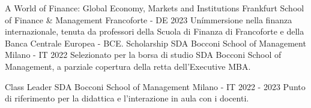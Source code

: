 
\begin{cventries}
  \cventry
  {A World of Finance: Global Economy, Markets and Institutions} %
  {Frankfurt School of Finance \& Management} %
  {}
  {Francoforte - DE} %
  {2023} %
  {
    Un\'immersione nella finanza internazionale, tenuta da professori della Scuola di Finanza di Francoforte e della Banca Centrale Europea - BCE.
  }
  \cventry
    {Scholarship} %
    {SDA Bocconi School of Management} %
    {}
    {Milano - IT} %
    {2022} %
    {
      Selezionato per la borsa di studio SDA Bocconi School of Management, a parziale copertura della retta dell'Executive MBA.    }
    
  \cventry
  {Class Leader} %
  {SDA Bocconi School of Management} %
  {}
  {Milano - IT} %
  {2022 - 2023} %
  {
    Punto di riferimento per la didattica e l'interazione in aula con i docenti.
  }
\end{cventries}